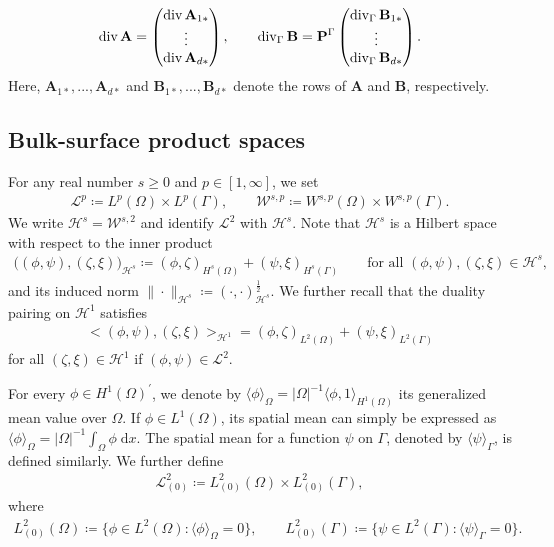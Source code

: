 \documentclass[10pt,reqno]{amsart}
\theoremstyle{remark}
\numberwithin{equation}{section}
\newcommand{\abs}[1]{| #1 |}
\newcommand{\norm}[1]{\| #1 \|}
\newcommand{\ang}[2]{ \langle #1 , #2  \rangle}
\newcommand{\bigang}[2]{ \big< #1 , #2  \big>}
\newcommand{\scp}[2]{ ( #1 , #2  )}
\newcommand{\bigscp}[2]{\big( #1 , #2 \big)}
\newcommand{\meano}[1]{{\langle #1 \rangle}_{\Omega}}
\newcommand{\meang}[1]{{\langle #1 \rangle}_{\Gamma}}
\newcommand{\intO}{\int_\Omega}
\newcommand{\dx}{\;\mathrm{d}x}
\newcommand{\Div}{\textnormal{div}}
\newcommand{\Divg}{\textnormal{div}_\Ga}
\newcommand{\Om}{\Omega}
\newcommand{\Ga}{\Gamma}
\begin{document}
\begin{align*}
    \Div\,\mathbf{A} = 
    \begin{pmatrix}
        \Div\, \mathbf{A}_{1\ast} \\ \vdots \\ \Div\, \mathbf{A}_{d\ast}
    \end{pmatrix},
    \qquad
    \Divg\,\mathbf{B} = \mathbf{P}^\Gamma
    \begin{pmatrix}
        \Divg\, \mathbf{B}_{1\ast} 
        \\ 
        \vdots 
        \\ \Divg\, \mathbf{B}_{d\ast}  
    \end{pmatrix}.
\end{align*}
Here, $\mathbf{A}_{1\ast},...,\mathbf{A}_{d\ast}$ and $\mathbf{B}_{1\ast},...,\mathbf{B}_{d\ast}$ denote the rows of $\mathbf{A}$ and $\mathbf{B}$, respectively.



\subsection{Bulk-surface product spaces}
For any real number $s\geq 0$ and $p\in[1,\infty]$, we set
\begin{align*}
	\mathcal{L}^p \coloneqq L^p(\Om)\times L^p(\Ga), \qquad \mathcal{W}^{s,p} \coloneqq W^{s,p}(\Om)\times W^{s,p}(\Ga).
\end{align*}
We write $\mathcal{H}^s = \mathcal{W}^{s,2}$ and identify $\mathcal{L}^2$ with $\mathcal{H}^s$. Note that $\mathcal{H}^s$ is a Hilbert space with respect to the inner product
\begin{align*}
	\bigscp{\scp{\phi}{\psi}}{\scp{\zeta}{\xi}}_{\mathcal{H}^s} \coloneqq \scp{\phi}{\zeta}_{H^s(\Om)} + \scp{\psi}{\xi}_{H^s(\Ga)} \qquad\text{for all~}(\phi,\psi), (\zeta,\xi)\in\mathcal{H}^s,
\end{align*}
and its induced norm $\norm{\cdot}_{\mathcal{H}^s} \coloneqq \scp{\cdot}{\cdot}_{\mathcal{H}^s}^{\frac12}$. We further recall that the duality pairing on $\mathcal{H}^1$ satisfies
\begin{align*}
	\bigang{\scp{\phi}{\psi}}{\scp{\zeta}{\xi}}_{\mathcal{H}^1} = \scp{\phi}{\zeta}_{L^2(\Om)} + \scp{\psi}{\xi}_{L^2(\Ga)}
\end{align*}
for all $(\zeta,\xi)\in\mathcal{H}^1$ if $(\phi,\psi)\in\mathcal{L}^2$. 

For every $\phi\in H^1(\Om)^\prime$, we denote by $\meano{\phi} = \abs{\Om}^{-1}\ang{\phi}{1}_{H^1(\Om)}$ its generalized mean value over $\Om$. If $\phi\in L^1(\Om)$, its spatial mean can simply be expressed as $\meano{\phi} = \abs{\Om}^{-1}\intO\phi\dx$. The spatial mean for a function $\psi$ on $\Ga$, denoted by $\meang{\psi}$, is defined similarly. We further define 
\begin{align*}
    \mathcal{L}^2_{(0)} \coloneqq L^2_{(0)}(\Om)\times L^2_{(0)}(\Ga),
\end{align*}
where
\begin{align*}
	L^2_{(0)}(\Om) 
    \coloneqq \big\{\phi\in L^2(\Om): \meano{\phi} = 0\big\}, 
    \qquad 
    L^2_{(0)}(\Ga) 
    \coloneqq \big\{\psi\in L^2(\Ga): \meang{\psi} = 0\big\}.
\end{align*}
\end{document}
